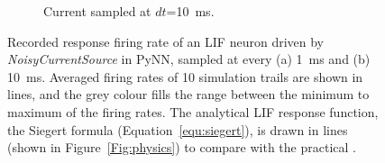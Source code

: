 \begin{figure}[tbp!]
\begin{subfigure}[t]{0.7\textwidth}
			\DIFaddendFL \caption{Current sampled at $dt$=10~ms.}
		\end{subfigure}
		\caption[Recorded response firing rate driven by \textit{NoisyCurrentSource}.]{Recorded response firing rate of an LIF neuron driven by \textit{NoisyCurrentSource} in PyNN, \DIFaddbeginFL {}\textit{} \DIFaddendFL sampled at every (a) 1~ms and (b) 10~ms. Averaged firing rates of 10 simulation trails \DIFaddbeginFL {}\DIFaddendFL are shown in \DIFdelbeginFL {}\DIFdelendFL \DIFaddbeginFL {}\DIFaddendFL lines, and the grey colour fills the range between the minimum to maximum of the firing rates. The analytical LIF response function, the Siegert formula (Equation~\ref{equ:siegert}), is drawn in \DIFdelbeginFL {}\DIFdelendFL \DIFaddbeginFL {}\DIFaddendFL lines (shown in Figure~\ref{Fig:physics}) to compare with the practical \DIFdelbeginFL {}\DIFdelendFL \DIFaddbeginFL {}\DIFaddendFL . \DIFaddbeginFL {}\DIFaddendFL }
		\label{Fig:current}
	\end{figure}

